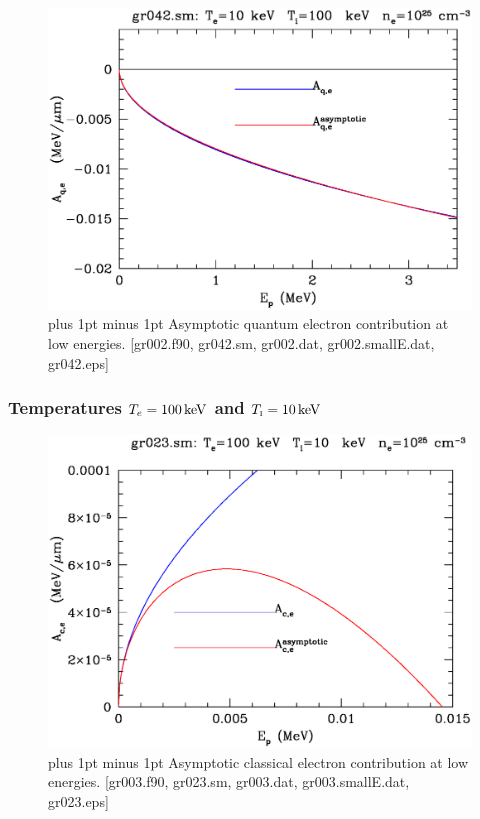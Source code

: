 \documentclass[preprint,12pt,eqsecnum,nofootinbib,amsmath,amssymb]{revtex4}
\newcommand{\smI}{{\rm\scriptscriptstyle I}}
\newcommand{\footnoteskip}{\baselineskip 12pt plus 1pt minus 1pt}
\begin{document}
\vskip-2cm 
\begin{figure}[h!]
\includegraphics[scale=0.45]{gr042.eps} 
\vskip-0.8cm 
\caption{\footnoteskip  
  Asymptotic quantum electron contribution at low
  energies. [gr002.f90, gr042.sm, gr002.dat, gr002.smallE.dat,
  gr042.eps] 
}
\label{fig:gr042}
\end{figure}


\pagebreak
\subsubsection{Temperatures $T_e=100\,{\rm keV}$ and $T_\smI=10\,{\rm keV}$}

\vskip-2cm 
\begin{figure}[h!]
\includegraphics[scale=0.45]{gr023.eps} 
\vskip-0.5cm 
\caption{\footnoteskip  
  Asymptotic classical electron contribution at low
  energies. [gr003.f90, gr023.sm, gr003.dat, gr003.smallE.dat,
  gr023.eps]
}
\label{fig:gr023}
\end{figure}
\end{document}
